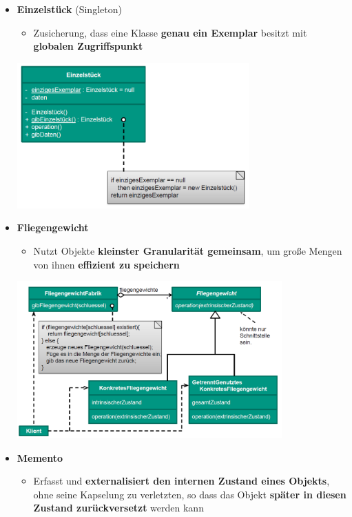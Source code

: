 \begin{itemize}
\item \textbf{Einzelstück} (Singleton)
\begin{itemize}
\item Zusicherung, dass eine Klasse \textbf{genau ein Exemplar} besitzt mit \textbf{globalen Zugriffspunkt}
\end{itemize}
\begin{center}
\includegraphics[width=0.7\textwidth]{../images/einzelstueck.png}
\end{center}
\newpage
\item \textbf{Fliegengewicht}
\begin{itemize}
\item Nutzt Objekte \textbf{kleinster Granularität gemeinsam}, um große Mengen von ihnen \textbf{effizient zu speichern}
\end{itemize}
\begin{center}
\includegraphics[width=0.8\textwidth]{../images/fliegengewicht.png}
\end{center}
\item \textbf{Memento}
\begin{itemize}
\item Erfasst und \textbf{externalisiert den internen Zustand eines Objekts}, ohne seine Kapselung zu verletzten, so dass das Objekt \textbf{später in diesen Zustand zurückversetzt} werden kann

\end{itemize}
\end{itemize}
